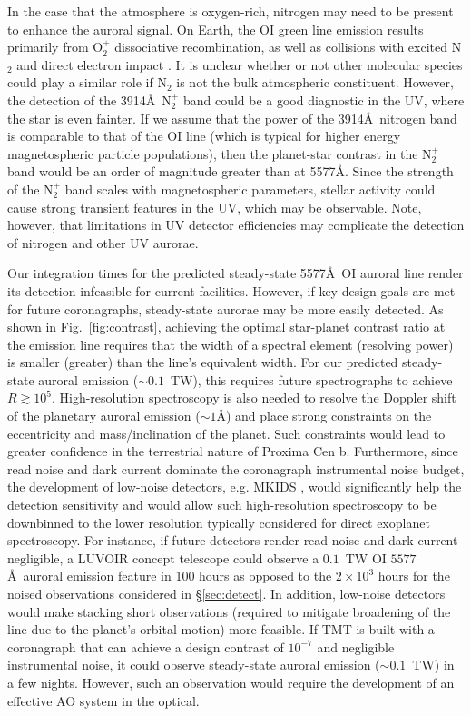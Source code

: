 \documentclass{emulateapj}
\begin{document}
In the case that the atmosphere is oxygen-rich, nitrogen may need to be present to enhance the auroral signal. On Earth, the OI green line emission results primarily from O$_2^+$ dissociative recombination, as well as collisions with excited N$_2$ and direct electron impact \citep{Strickland2000}. It is unclear whether or not other molecular species could play a similar role if N$_2$ is not the bulk atmospheric constituent. However, the detection of the 3914\AA\ N$_2^+$ band could be a good diagnostic in the UV, where the star is even fainter. If we assume that the power of the 3914\AA\ nitrogen band is comparable to that of the OI line (which is typical for higher energy magnetospheric particle populations), then the planet-star contrast in the N$_2^+$ band would be an order of magnitude greater than at 5577\AA. Since the strength of the N$_2^+$ band scales with magnetospheric parameters, stellar activity could cause strong transient features in the UV, which may be observable. Note, however, that limitations in UV detector efficiencies may complicate the detection of nitrogen and other UV aurorae.

Our integration times for the predicted steady-state 5577\AA\ OI auroral line render its detection infeasible for current facilities. However, if key design goals are met for future coronagraphs, steady-state aurorae may be more easily detected. As shown in Fig.~\ref{fig:contrast}, achieving the optimal star-planet contrast ratio at the emission line requires that the width of a spectral element (resolving power) is smaller (greater) than the line's equivalent width. For our predicted steady-state auroral emission (${\sim}0.1$~TW), this requires future spectrographs to achieve $R \gtrsim 10^5$. High-resolution spectroscopy is also needed to resolve the Doppler shift of the planetary auroral emission (${\sim}1$\AA) and place strong constraints on the eccentricity and mass/inclination of the planet. Such constraints would lead to greater confidence in the terrestrial nature of Proxima Cen b. Furthermore, since read noise and dark current dominate the coronagraph instrumental noise budget, the development of low-noise detectors, e.g. MKIDS \citep{Mazin2012,Mazin2015}, would significantly help the detection sensitivity and would allow such high-resolution spectroscopy to be downbinned to the lower resolution typically considered for direct exoplanet spectroscopy. For instance, if future detectors render read noise and dark current negligible, a LUVOIR concept telescope could observe a $0.1$~TW OI $5577$\AA\ auroral emission feature in 100 hours as opposed to the $2 \times 10^3$ hours for the noised observations considered in \S\ref{sec:detect}. In addition, low-noise detectors would make stacking short observations (required to mitigate broadening of the line due to the planet's orbital motion) more feasible. If TMT is built with a coronagraph that can achieve a design contrast of $10^{-7}$ and negligible instrumental noise, it could observe steady-state auroral emission (${\sim}0.1$~TW) in a few nights. However, such an observation would require the development of an effective AO system in the optical.
\end{document}
